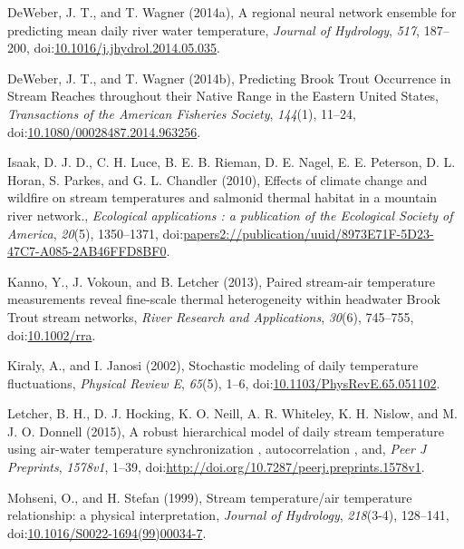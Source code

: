 \hypertarget{ref-DeWeber2014a}{}
DeWeber, J. T., and T. Wagner (2014a), A regional neural network
ensemble for predicting mean daily river water temperature,
\emph{Journal of Hydrology}, \emph{517}, 187--200,
doi:\href{https://doi.org/10.1016/j.jhydrol.2014.05.035}{10.1016/j.jhydrol.2014.05.035}.

\hypertarget{ref-DeWeber2014}{}
DeWeber, J. T., and T. Wagner (2014b), Predicting Brook Trout Occurrence
in Stream Reaches throughout their Native Range in the Eastern United
States, \emph{Transactions of the American Fisheries Society},
\emph{144}(1), 11--24,
doi:\href{https://doi.org/10.1080/00028487.2014.963256}{10.1080/00028487.2014.963256}.

\hypertarget{ref-Isaak2010b}{}
Isaak, D. J. D., C. H. Luce, B. E. B. Rieman, D. E. Nagel, E. E.
Peterson, D. L. Horan, S. Parkes, and G. L. Chandler (2010), Effects of
climate change and wildfire on stream temperatures and salmonid thermal
habitat in a mountain river network., \emph{Ecological applications : a
publication of the Ecological Society of America}, \emph{20}(5),
1350--1371,
doi:\href{https://doi.org/papers2://publication/uuid/8973E71F-5D23-47C7-A085-2AB46FFD8BF0}{papers2://publication/uuid/8973E71F-5D23-47C7-A085-2AB46FFD8BF0}.

\hypertarget{ref-Kanno2013}{}
Kanno, Y., J. Vokoun, and B. Letcher (2013), Paired stream-air
temperature measurements reveal fine-scale thermal heterogeneity within
headwater Brook Trout stream networks, \emph{River Research and
Applications}, \emph{30}(6), 745--755,
doi:\href{https://doi.org/10.1002/rra}{10.1002/rra}.

\hypertarget{ref-Kiraly2002}{}
Kiraly, A., and I. Janosi (2002), Stochastic modeling of daily
temperature fluctuations, \emph{Physical Review E}, \emph{65}(5), 1--6,
doi:\href{https://doi.org/10.1103/PhysRevE.65.051102}{10.1103/PhysRevE.65.051102}.

\hypertarget{ref-Letcher2015}{}
Letcher, B. H., D. J. Hocking, K. O. Neill, A. R. Whiteley, K. H.
Nislow, and M. J. O. Donnell (2015), A robust hierarchical model of
daily stream temperature using air-water temperature synchronization ,
autocorrelation , and, \emph{Peer J Preprints}, \emph{1578v1}, 1--39,
doi:\href{https://doi.org/http://doi.org/10.7287/peerj.preprints.1578v1}{http://doi.org/10.7287/peerj.preprints.1578v1}.

\hypertarget{ref-Mohseni1999}{}
Mohseni, O., and H. Stefan (1999), Stream temperature/air temperature
relationship: a physical interpretation, \emph{Journal of Hydrology},
\emph{218}(3-4), 128--141,
doi:\href{https://doi.org/10.1016/S0022-1694(99)00034-7}{10.1016/S0022-1694(99)00034-7}.

